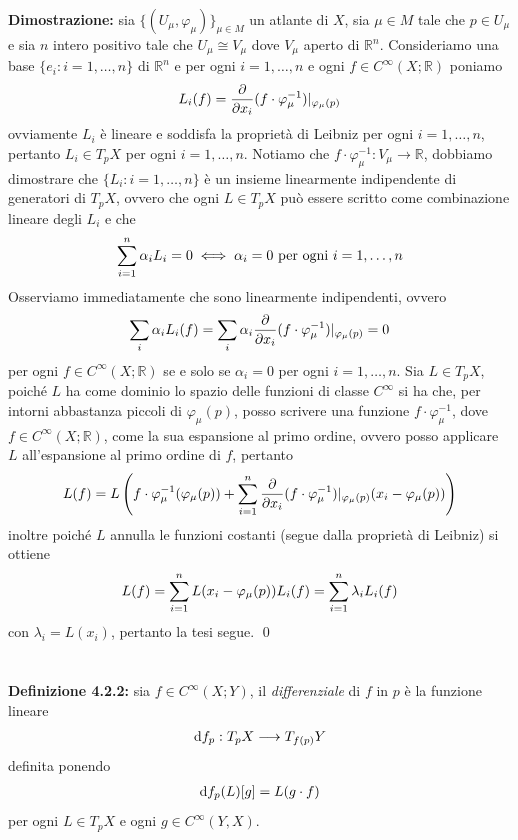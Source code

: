 \documentclass{article}
\begin{document}
\textbf{Dimostrazione:} sia $\{ (U_\mu, \varphi_\mu) \}_{\mu \in M}$ un atlante di $X$, sia $\mu \in M$ tale che $p \in U_\mu$ e sia $n$ intero positivo tale che $U_\mu \cong V_\mu$ dove $V_\mu$ aperto di $\mathbb{R}^n$. Consideriamo una base $\{ e_i : i = 1, \dots, n \}$ di $\mathbb{R}^n$ e per ogni $i = 1, \dots, n$ e ogni $f \in C^{\infty}(X; \mathbb{R})$ poniamo
\begin{gather}
    L_i(f) = \frac{\partial}{ \partial x_i}(f \cdot \varphi^{-1}_\mu)|_{\varphi_\mu(p)} \notag
\end{gather}
ovviamente $L_i$ è lineare e soddisfa la proprietà di Leibniz per ogni $i = 1, \dots, n$, pertanto $L_i \in T_p X$ per ogni $i = 1, \dots, n$. Notiamo che $f \cdot \varphi^{-1}_\mu : V_\mu \longrightarrow \mathbb{R}$, dobbiamo dimostrare che $\{ L_i : i = 1, \dots, n \}$ è un insieme linearmente indipendente di generatori di $T_p X$, ovvero che ogni $L \in T_p X$ può essere scritto come combinazione lineare degli $L_i$ e che
\begin{gather}
    \sum_{i = 1}^n \alpha_i L_i = 0 \iff \alpha_i = 0 \text{ per ogni } i = 1, \dots, n \notag
\end{gather}
Osserviamo immediatamente che sono linearmente indipendenti, ovvero
\begin{gather}
    \sum_i \alpha_i L_i(f) = \sum_i \alpha_i \frac{\partial}{\partial x_i}(f \cdot \varphi^{-1}_\mu)|_{\varphi_\mu(p)} = 0 \notag
\end{gather}
per ogni $f \in C^{\infty}(X; \mathbb{R})$ se e solo se $\alpha_i = 0$ per ogni $i = 1, \dots, n$. Sia $L \in T_p X$, poiché $L$ ha come dominio lo spazio delle funzioni di classe $C^{\infty}$ si ha che, per intorni abbastanza piccoli di $\varphi_\mu(p)$, posso scrivere una funzione $f \cdot \varphi^{-1}_\mu$, dove $f \in C^{\infty}(X; \mathbb{R})$, come la sua espansione al primo ordine, ovvero posso applicare $L$ all'espansione al primo ordine di $f$, pertanto
\begin{gather}
    L(f) = L \left( f \cdot \varphi^{-1}_\mu(\varphi_\mu(p)) + \sum_{i = 1}^n \frac{\partial}{\partial x_i}(f \cdot \varphi^{-1}_\mu)|_{\varphi_\mu(p)} (x_i - \varphi_\mu(p)) \right) \notag
\end{gather}
inoltre poiché $L$ annulla le funzioni costanti (segue dalla proprietà di Leibniz) si ottiene
\begin{gather}
    L(f) = \sum_{i = 1}^n L(x_i - \varphi_\mu(p))L_i(f) = \sum_{i = 1}^n \lambda_i L_i(f) \notag
\end{gather}
con $\lambda_i = L(x_i)$, pertanto la tesi segue. \qed \\ \\ \\
\textbf{Definizione 4.2.2:} sia $f \in C^{\infty}(X; Y)$, il \textit{differenziale} di $f$ in $p$ è la funzione lineare
\begin{gather}
    \mathrm{d}f_p : T_pX \longrightarrow T_{f(p)}Y \notag
\end{gather}
definita ponendo
\begin{gather}
    \mathrm{d}f_p(L)[g] = L(g \cdot f) \notag
\end{gather}
per ogni $L \in T_pX$ e ogni $g \in C^{\infty}(Y, X)$.
\end{document}
